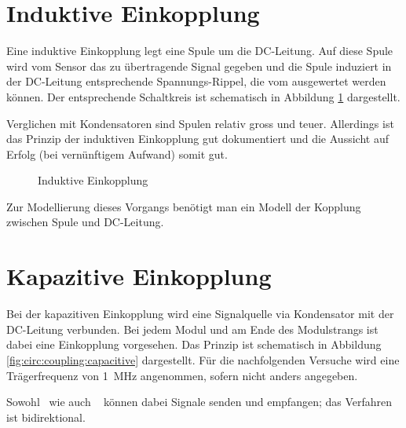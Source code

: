 \section{Induktive Einkopplung}
\label{sec:simu:coupling:inductive}

Eine induktive Einkopplung legt eine  Spule um die DC-Leitung. Auf diese Spule
wird vom Sensor  das zu \"ubertragende Signal gegeben und  die Spule induziert
in der DC-Leitung entsprechende  Spannungs-Rippel, die vom \Master ausgewertet
werden k\"onnen. Der  entsprechende Schaltkreis  ist schematisch  in Abbildung
\ref{fig:circ:coupling:inductive} dargestellt.

Verglichen mit  Kondensatoren sind Spulen relativ  gross und teuer. Allerdings
ist das Prinzip  der induktiven Einkopplung gut dokumentiert  und die Aussicht
auf Erfolg (bei vern\"unftigem Aufwand) somit gut.

\begin{figure}[h!tb]
    \centering
    
    \caption{Induktive Einkopplung}
    \label{fig:circ:coupling:inductive}
\end{figure}

Zur  Modellierung  dieses Vorgangs  ben\"otigt  man  ein Modell  der  Kopplung
zwischen Spule und DC-Leitung.

\clearpage
\section{Kapazitive Einkopplung}
\label{sec:simu:coupling:capacitive}

Bei der  kapazitiven Einkopplung  wird eine  Signalquelle via  Kondensator mit
der  DC-Leitung  verbunden. Bei  jedem  Modul und  am  Ende  des  Modulstrangs
ist   dabei  eine   Einkopplung   vorgesehen. Das   Prinzip  ist   schematisch
in   Abbildung   \ref{fig:circ:coupling:capacitive}   dargestellt. F\"ur   die
nachfolgenden  Versuche  wird  eine Tr\"agerfrequenz  von  \SI{1}{\mega\hertz}
angenommen, sofern nicht anders angegeben.

Sowohl \Master ~wie auch \Sensor~ k\"onnen dabei Signale senden und empfangen;
das Verfahren ist bidirektional.

